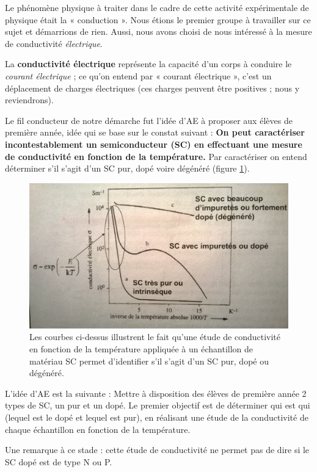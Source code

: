 Le phénomène physique à traiter dans le cadre de cette activité expérimentale de physique était la « conduction ». 
Nous étions le premier groupe à travailler sur ce sujet et démarrions de rien. 
Aussi, nous avons choisi de nous intéressé à la mesure de conductivité \textit{électrique}.

La \textbf{conductivité électrique} représente la capacité d'un corps à conduire le \textit{courant électrique} ; 
ce qu'on entend par « courant électrique », c'est un déplacement de charges électriques 
(ces charges peuvent être positives ; nous y reviendrons).

\bigskip
Le fil conducteur de notre démarche fut l'idée d'AE à proposer aux élèves de première année, 
idée qui se base sur le constat suivant :
\textbf{On peut caractériser incontestablement un semiconducteur (SC) en effectuant 
une mesure de conductivité en fonction de la température.}
Par caractériser on entend déterminer s'il s'agit d'un SC pur, dopé voire dégénéré (figure \ref{conduc}).

\begin{figure}
  \centering
  \includegraphics{./images/conductivite.jpg}
  \caption{Les courbes ci-dessus illustrent le fait
  qu'une étude de conductivité en fonction de la température appliquée à un échantillon de matériau SC
  permet d'identifier s'il s'agit d'un SC pur, dopé ou dégénéré.}
  \label{conduc}
\end{figure}

\bigskip
L'idée d'AE est la suivante :
Mettre à disposition des élèves de première année 2 types de SC, un pur et un dopé. 
Le premier objectif est de déterminer qui est qui (lequel est le dopé et lequel est pur), 
en réalisant une étude de la conductivité de chaque échantillon 
en fonction de la température.

Une remarque à ce stade : cette étude de conductivité ne permet pas de dire si le SC dopé est de type N ou P.

